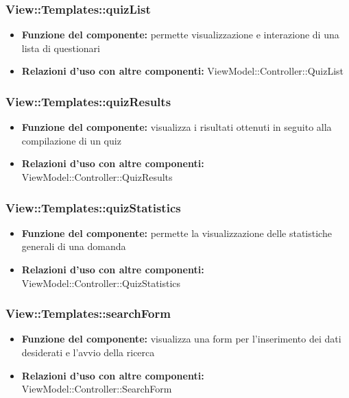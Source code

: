 \subsubsection{View::Templates::quizList}
\begin{itemize}
\item\textbf{Funzione del componente:} permette visualizzazione e interazione di una lista di questionari\\
\item\textbf{Relazioni d'uso con altre componenti:} ViewModel::Controller::QuizList\\
\end{itemize}
\subsubsection{View::Templates::quizResults}
\begin{itemize}
\item\textbf{Funzione del componente:} visualizza i risultati ottenuti in seguito alla compilazione di un quiz\\
\item\textbf{Relazioni d'uso con altre componenti:} ViewModel::Controller::QuizResults\\
\end{itemize}
\subsubsection{View::Templates::quizStatistics}
\begin{itemize}
\item\textbf{Funzione del componente:} permette la visualizzazione delle statistiche generali di una domanda\\
\item\textbf{Relazioni d'uso con altre componenti:} ViewModel::Controller::QuizStatistics\\
\end{itemize}
\subsubsection{View::Templates::searchForm}
\begin{itemize}
\item\textbf{Funzione del componente:} visualizza una form per l’inserimento dei dati desiderati e l’avvio della ricerca\\
\item\textbf{Relazioni d'uso con altre componenti:} ViewModel::Controller::SearchForm\\
\end{itemize}
